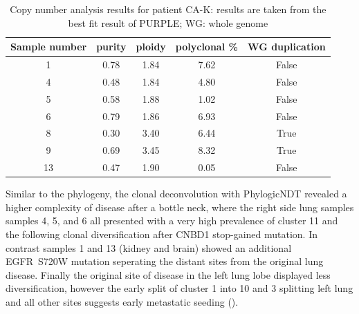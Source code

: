 \begin{table}[ht]
\caption[Copy number analysis results for patient CA-K]{Copy number analysis results for patient CA-K: results are taken from the best fit result of PURPLE; WG: whole genome}\label{tab:ca82cnv}
\centering
{}
\begin{tabular}{|c|c|c|c|c|}
\toprule
\hline
 \rowcolor{gray!50}
\textbf{Sample number} & \textbf{purity} & \textbf{ploidy} & \textbf{polyclonal \%} & \textbf{WG duplication}\\
\hline
 1 & \num{0.78} &	 \num{1.84} &	\num{7.62} & False	\\
 4 & \num{0.48} & \num{1.84} & \num{4.80} & False \\
 5 & \num{0.58} & \num{1.88} & \num{1.02} & False \\
 6 & \num{0.79} & \num{1.86} & \num{6.93} & False \\
 8 & \num{0.30} & \num{3.40} & \num{6.44} & True \\
 9 & \num{0.69} & \num{3.45} & \num{8.32} & True \\
 13 & \num{0.47} & \num{1.90} & \num{0.05} & False \\
 \hline
\bottomrule
\end{tabular}
\end{table} 


Similar to the phylogeny, the clonal deconvolution with PhylogicNDT revealed a higher complexity of disease after a bottle neck, where the right side lung samples samples 4, 5, and 6 all presented with a very high prevalence of cluster 11 and the following clonal diversification after CNBD1 stop-gained mutation. In contrast samples 1 and 13 (kidney and brain) showed an additional EGFR~S720W mutation seperating the distant sites from the original lung disease. Finally the original site of disease in the left lung lobe displayed less diversification, however the early split of cluster 1 into 10 and 3 splitting left lung and all other sites suggests early metastatic seeding (). 

